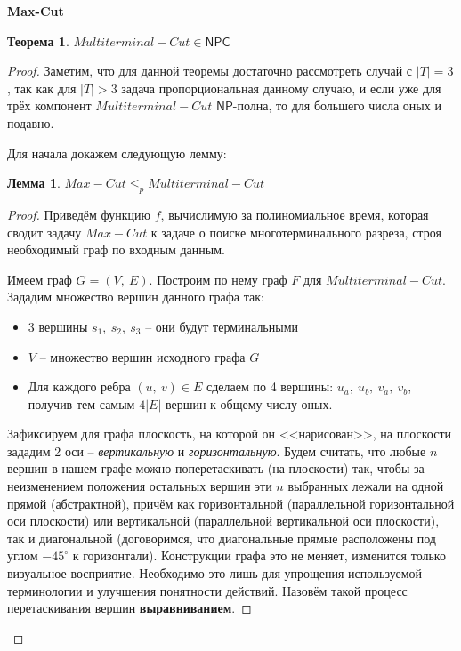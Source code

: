\documentclass[a4paper,12pt]{article}
\newcommand{\NPclass}{\mathsf{NP}}
\newcommand{\NPCclass}{\mathsf{NPC}}
\newtheorem{theorem}{Теорема}
\newtheorem*{lemma}{Лемма}
\newcommand{\N}{\mathbb{N}}
\begin{document}
\textbf{Max-Cut}
\begin{algorithmic}
    \Require{$G = (V,\ E),\ k \in \N$ -- невзвешенный неориентированный граф}
\end{algorithmic}
\begin{theorem}
$Multiterminal-Cut \in \NPCclass$
\end{theorem}
\begin{proof}
    Заметим, что для данной теоремы достаточно рассмотреть случай с $|T| = 3$, так как для $|T| > 3$ задача пропорциональная данному случаю, и если уже для трёх компонент $Multiterminal-Cut$ $\NPclass$-полна, то для большего числа оных и подавно.
    
    Для начала докажем следующую лемму:
    \begin{lemma}
    $Max-Cut \leqslant_p Multiterminal-Cut$
    \end{lemma}
    \begin{proof}
        Приведём функцию $f$, вычислимую за полиномиальное время, которая сводит задачу $Max-Cut$ к задаче о поиске многотерминального разреза, строя необходимый граф по входным данным.
        
        Имеем граф $G = (V,\ E)$. Построим по нему граф $F$ для $Multiterminal-Cut$. Зададим множество вершин данного графа так:
        \begin{itemize}
            \item 3 вершины $s_1,\ s_2,\ s_3$ -- они будут терминальными
            \item $V$ -- множество вершин исходного графа $G$
            \item Для каждого ребра $(u,\ v) \in E$ сделаем по 4 вершины: $u_a,\ u_b,\ v_a,\ v_b$, получив тем самым $4|E|$ вершин к общему числу оных.
        \end{itemize}
        
        Зафиксируем для графа плоскость, на которой он <<нарисован>>, на плоскости зададим 2 оси -- \textit{вертикальную} и \textit{горизонтальную}. Будем считать, что любые $n$ вершин в нашем графе можно поперетаскивать (на плоскости) так, чтобы за неизменением положения остальных вершин эти $n$ выбранных лежали на одной прямой (абстрактной), причём как горизонтальной (параллельной горизонтальной оси плоскости) или вертикальной (параллельной вертикальной оси плоскости), так и диагональной (договоримся, что диагональные прямые расположены под углом $-45^{\circ}$ к горизонтали). Конструкции графа это не меняет, изменится только визуальное восприятие. Необходимо это лишь для упрощения используемой терминологии и улучшения понятности действий. Назовём такой процесс перетаскивания вершин \textbf{выравниванием}. 
        

\end{proof}
\end{proof}
\end{document}
